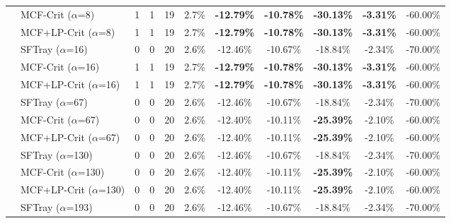 \begin{table}[t]
{\begin{tabular}{ll|cccc|ccc|cc}
 & MCF-Crit ($\alpha$=8) & 1 & 1 & 19 & 2.7\% & \textbf{-12.79\%} & \textbf{-10.78\%} & \textbf{-30.13\%} & \textbf{-3.31\%} & -60.00\% \\

 & MCF+LP-Crit ($\alpha$=8) & 1 & 1 & 19 & 2.7\% & \textbf{-12.79\%} & \textbf{-10.78\%} & \textbf{-30.13\%} & \textbf{-3.31\%} & -60.00\% \\

\addlinespace[0.5em]

 & SFTray ($\alpha$=16) & 0 & 0 & 20 & 2.6\% & -12.46\% & -10.67\% & -18.84\% & -2.34\% & -70.00\% \\

 & MCF-Crit ($\alpha$=16) & 1 & 1 & 19 & 2.7\% & \textbf{-12.79\%} & \textbf{-10.78\%} & \textbf{-30.13\%} & \textbf{-3.31\%} & -60.00\% \\

 & MCF+LP-Crit ($\alpha$=16) & 1 & 1 & 19 & 2.7\% & \textbf{-12.79\%} & \textbf{-10.78\%} & \textbf{-30.13\%} & \textbf{-3.31\%} & -60.00\% \\

\addlinespace[0.5em]

 & SFTray ($\alpha$=67) & 0 & 0 & 20 & 2.6\% & -12.46\% & -10.67\% & -18.84\% & -2.34\% & -70.00\% \\

 & MCF-Crit ($\alpha$=67) & 0 & 0 & 20 & 2.6\% & -12.40\% & -10.11\% & \textbf{-25.39\%} & -2.10\% & -60.00\% \\

 & MCF+LP-Crit ($\alpha$=67) & 0 & 0 & 20 & 2.6\% & -12.40\% & -10.11\% & \textbf{-25.39\%} & -2.10\% & -60.00\% \\

\addlinespace[0.5em]

 & SFTray ($\alpha$=130) & 0 & 0 & 20 & 2.6\% & -12.46\% & -10.67\% & -18.84\% & -2.34\% & -70.00\% \\

 & MCF-Crit ($\alpha$=130) & 0 & 0 & 20 & 2.6\% & -12.40\% & -10.11\% & \textbf{-25.39\%} & -2.10\% & -60.00\% \\

 & MCF+LP-Crit ($\alpha$=130) & 0 & 0 & 20 & 2.6\% & -12.40\% & -10.11\% & \textbf{-25.39\%} & -2.10\% & -60.00\% \\

\addlinespace[0.5em]

 & SFTray ($\alpha$=193) & 0 & 0 & 20 & 2.6\% & -12.46\% & -10.67\% & -18.84\% & -2.34\% & -70.00\% \\


\end{tabular}}
\end{table}
